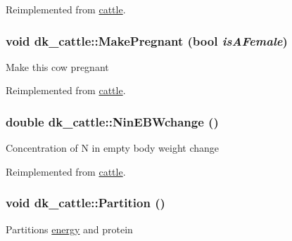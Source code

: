 Reimplemented from \hyperlink{classcattle_a268ab4ca694f20f0207125ef11992933}{cattle}.\hypertarget{classdk__cattle_a015a7a7fd47f94af868165d276d26142}{
\subsubsection[{MakePregnant}]{\setlength{\rightskip}{0pt plus 5cm}void dk\_\-cattle::MakePregnant (bool {\em isAFemale})}}
\label{classdk__cattle_a015a7a7fd47f94af868165d276d26142}
Make this cow pregnant 

Reimplemented from \hyperlink{classcattle_adec0490651ec7d3cfb5b90250dd42dc0}{cattle}.\hypertarget{classdk__cattle_a15d4305d06c0046414ba06a00904c0b9}{
\subsubsection[{NinEBWchange}]{\setlength{\rightskip}{0pt plus 5cm}double dk\_\-cattle::NinEBWchange ()}}
\label{classdk__cattle_a15d4305d06c0046414ba06a00904c0b9}
Concentration of N in empty body weight change 

Reimplemented from \hyperlink{classcattle_adc0149dd773e4a12265c5e144eef6064}{cattle}.\hypertarget{classdk__cattle_a2d6a1d109141cc874f41d4e462eaa728}{
\subsubsection[{Partition}]{\setlength{\rightskip}{0pt plus 5cm}void dk\_\-cattle::Partition ()}}
\label{classdk__cattle_a2d6a1d109141cc874f41d4e462eaa728}
Partitions \hyperlink{classenergy}{energy} and protein 

